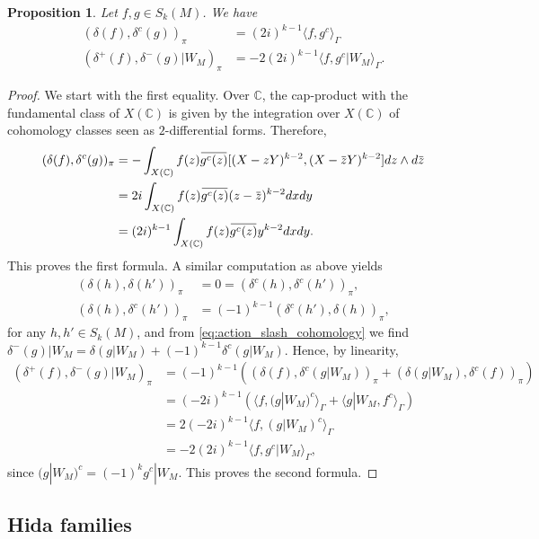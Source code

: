 \documentclass[12pt]{amsart}
\newcommand\bC{\mathbb{C}}
\newcommand{\ob}[1]{\mkern 1.5mu\overline{\mkern-1.5mu#1\mkern-1.5mu}\mkern 1.5mu}
\theoremstyle{defstyle}
\theoremstyle{thmstyle}
\newtheorem{proposition}[subsubsection]{Proposition}
\begin{document}
\begin{proposition}\label{prop:calcul_poincare_pairing}
	Let $f,g\in S_k(M)$. We have 
	\begin{align*}
		(\delta(f),\delta^c(g))_\pi&= (2i)^{k-1}\langle f,g^c\rangle_\Gamma \\
		(\delta^+(f),\delta^-(g)|W_M)_\pi&=-2(2i)^{k-1}\langle f,g^c|W_M\rangle_\Gamma.
	\end{align*}
\end{proposition}
\begin{proof}
	We start with the first equality. Over $\bC$, the cap-product with the fundamental class of $X(\bC)$ is given by the integration over $X(\bC)$ of cohomology classes seen as $2$-differential forms. Therefore,
	\begin{align*}
		(\delta(f),\delta^c(g))_\pi &= - \int_{X(\bC)}   f(z)\ob{g^c(z)} [(X-zY)^{k-2},(X-\ob{z}Y)^{k-2}] dz\wedge d\ob{z} \\
		&= 2i \int_{X(\bC)} f(z)\ob{g^c(z)}(z-\ob{z})^{k-2} dxdy \\
		&=(2i)^{k-1}\int_{X(\bC)} f(z)\ob{g^c(z)}y^{k-2} dxdy.
	\end{align*}
This proves the first formula. A similar computation as above yields \small
\begin{align*}
	(\delta(h),\delta(h'))_\pi&=0=(\delta^c(h),\delta^c(h'))_\pi, \\  (\delta(h),\delta^c(h'))_\pi&=(-1)^{k-1}(\delta^c(h'),\delta(h))_\pi,
\end{align*}
\normalsize for any $h,h'\in S_k(M)$, and from \eqref{eq:action_slash_cohomology} we find $\delta^-(g)|W_M=\delta(g|W_M)+(-1)^{k-1}\delta^c(g|W_M)$. Hence, by linearity,
\begin{align*}
	(\delta^+(f),\delta^-(g)|W_M)_\pi&= (-1)^{k-1} \left( (\delta(f),\delta^c(g|W_M))_\pi + (\delta(g|W_M),\delta^c(f))_\pi \right) \\
									&=(-2i)^{k-1}\left(\langle f,(g|W_M)^c\rangle_\Gamma+\langle g|W_M,f^c\rangle_\Gamma\right) \\
									&= 2(-2i)^{k-1}\langle f,(g|W_M)^c\rangle_\Gamma \\
									&=-2(2i)^{k-1}\langle f,g^c|W_M\rangle_\Gamma,
\end{align*}
since $(g|W_M)^c=(-1)^kg^c|W_M$. This proves the second formula.
\end{proof}

\subsection{Hida families}
\end{document}

